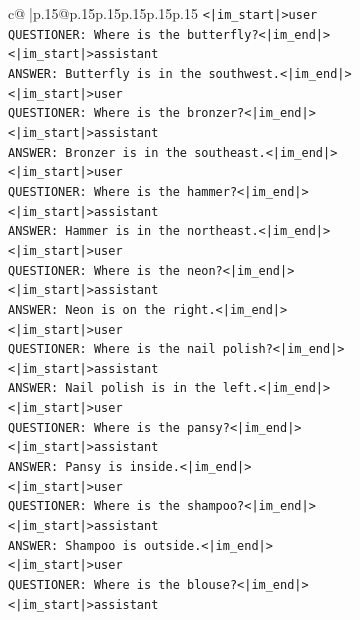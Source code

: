 \documentclass{article}
\begin{document}
{\begin{supertabular}{c@{$\;$}|p{.15\linewidth}@{}p{.15\linewidth}p{.15\linewidth}p{.15\linewidth}p{.15\linewidth}p{.15\linewidth}}
{{{\texttt{<|im\_start|>user} \\
\texttt{QUESTIONER: Where is the butterfly?<|im\_end|>} \\
\texttt{<|im\_start|>assistant} \\
\texttt{ANSWER: Butterfly is in the southwest.<|im\_end|>} \\
\texttt{<|im\_start|>user} \\
\texttt{QUESTIONER: Where is the bronzer?<|im\_end|>} \\
\texttt{<|im\_start|>assistant} \\
\texttt{ANSWER: Bronzer is in the southeast.<|im\_end|>} \\
\texttt{<|im\_start|>user} \\
\texttt{QUESTIONER: Where is the hammer?<|im\_end|>} \\
\texttt{<|im\_start|>assistant} \\
\texttt{ANSWER: Hammer is in the northeast.<|im\_end|>} \\
\texttt{<|im\_start|>user} \\
\texttt{QUESTIONER: Where is the neon?<|im\_end|>} \\
\texttt{<|im\_start|>assistant} \\
\texttt{ANSWER: Neon is on the right.<|im\_end|>} \\
\texttt{<|im\_start|>user} \\
\texttt{QUESTIONER: Where is the nail polish?<|im\_end|>} \\
\texttt{<|im\_start|>assistant} \\
\texttt{ANSWER: Nail polish is in the left.<|im\_end|>} \\
\texttt{<|im\_start|>user} \\
\texttt{QUESTIONER: Where is the pansy?<|im\_end|>} \\
\texttt{<|im\_start|>assistant} \\
\texttt{ANSWER: Pansy is inside.<|im\_end|>} \\
\texttt{<|im\_start|>user} \\
\texttt{QUESTIONER: Where is the shampoo?<|im\_end|>} \\
\texttt{<|im\_start|>assistant} \\
\texttt{ANSWER: Shampoo is outside.<|im\_end|>} \\
\texttt{<|im\_start|>user} \\
\texttt{QUESTIONER: Where is the blouse?<|im\_end|>} \\
\texttt{<|im\_start|>assistant} \\
}}}
\end{supertabular}}
\end{document}
